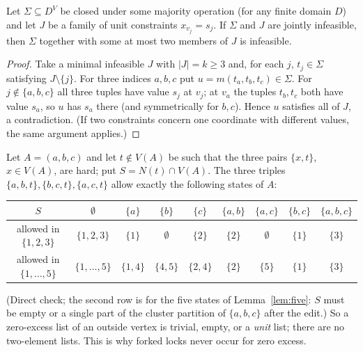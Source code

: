 \begin{lemma}\label{lem:sfH2}
Let $\Sigma\subseteq D^V$ be closed under some majority operation (for any finite domain $D$) and let $J$ be a family of unit constraints $x_{v_j}=s_j$. If $\Sigma$ and $J$ are jointly infeasible, then $\Sigma$ together with some at most two members of $J$ is infeasible.
\end{lemma}
\begin{proof}
Take a minimal infeasible $J$ with $|J|=k\ge3$ and, for each $j$, $t_j\in\Sigma$ satisfying $J\setminus\{j\}$. For three indices $a,b,c$ put $u=m(t_a,t_b,t_c)\in\Sigma$. For $j\notin\{a,b,c\}$ all three tuples have value $s_j$ at $v_j$; at $v_a$ the tuples $t_b,t_c$ both have value $s_a$, so $u$ has $s_a$ there (and symmetrically for $b,c$). Hence $u$ satisfies all of $J$, a contradiction. (If two constraints concern one coordinate with different values, the same argument applies.)
\end{proof}

\begin{observation}\label{obs:lists}
Let $A=(a,b,c)$ and let $t\notin V(A)$ be such that the three pairs $\{x,t\}$, $x\in V(A)$, are hard; put $S=N(t)\cap V(A)$. The three triples $\{a,b,t\},\{b,c,t\},\{a,c,t\}$ allow exactly the following states of $A$:
\begin{center}
\begin{tabular}{c|cccccccc}
$S$ & $\emptyset$ & $\{a\}$ & $\{b\}$ & $\{c\}$ & $\{a,b\}$ & $\{a,c\}$ & $\{b,c\}$ & $\{a,b,c\}$\\\hline
allowed in $\{1,2,3\}$ & $\{1,2,3\}$ & $\{1\}$ & $\emptyset$ & $\{2\}$ & $\{2\}$ & $\emptyset$ & $\{1\}$ & $\{3\}$\\
allowed in $\{1,\dots,5\}$ & $\{1,\dots,5\}$ & $\{1,4\}$ & $\{4,5\}$ & $\{2,4\}$ & $\{2\}$ & $\{5\}$ & $\{1\}$ & $\{3\}$
\end{tabular}
\end{center}
(Direct check; the second row is for the five states of Lemma~\ref{lem:five}: $S$ must be empty or a single part of the cluster partition of $\{a,b,c\}$ after the edit.) So a zero-excess list of an outside vertex is trivial, empty, or a \emph{unit} list; there are no two-element lists. This is why forked locks never occur for zero excess.
\end{observation}

